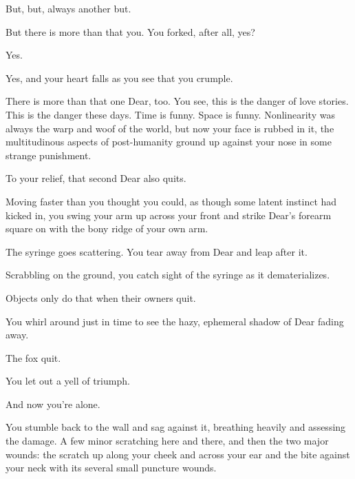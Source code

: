 \vfill

\newpage

\null
\vfill

But, but, always another but.

But there is more than that you. You forked, after all, yes?

Yes.

Yes, and your heart falls as you see that you crumple.

There is more than that one Dear, too. You see, this is the danger of love stories. This is the danger these days. Time is funny. Space is funny. Nonlinearity was always the warp and woof of the world, but now your face is rubbed in it, the multitudinous aspects of post-humanity ground up against your nose in some strange punishment.

To your relief, that second Dear also quits.

Moving faster than you thought you could, as though some latent instinct had kicked in, you swing your arm up across your front and strike Dear's forearm square on with the bony ridge of your own arm.

The syringe goes scattering. You tear away from Dear and leap after it.

Scrabbling on the ground, you catch sight of the syringe as it dematerializes.

Objects only do that when their owners quit.

You whirl around just in time to see the hazy, ephemeral shadow of Dear fading away.

\vfill

\newpage

\null
\vfill

The fox quit.

\null
\vfill

\newpage

\null
\vfill

You let out a yell of triumph.

\null
\vfill

\newpage

\null
\vfill

And now you're alone.

\null
\vfill

\newpage

You stumble back to the wall and sag against it, breathing heavily and assessing the damage. A few minor scratching here and there, and then the two major wounds: the scratch up along your cheek and across your ear and the bite against your neck with its several small puncture wounds.

